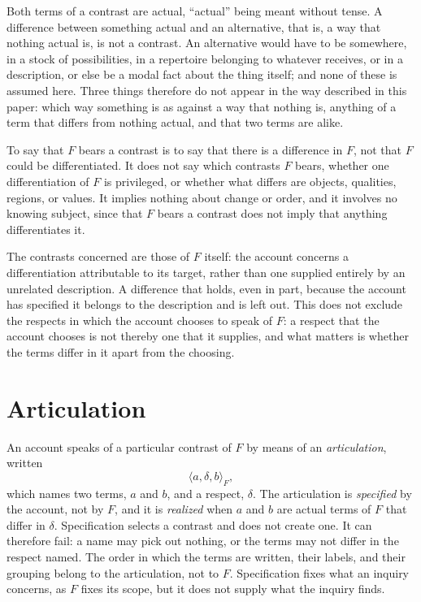 \documentclass[11pt,a4paper,oneside]{scrartcl}
\newcommand{\F}{\ensuremath{F}}
\begin{document}
Both terms of a contrast are actual, \enquote{actual} being meant without tense. A
difference between something actual and an alternative, that is, a way that nothing actual is, is
not a contrast. An alternative would have to be somewhere, in a stock of possibilities, in a
repertoire belonging to whatever receives, or in a description, or else be a modal fact about the
thing itself; and none of these is assumed here. Three things therefore do not appear in the way
described in this paper: which way something is as against a way that nothing is, anything of a
term that differs from nothing actual, and that two terms are alike.

To say that \F{} bears a contrast is to say that there is a difference in \F, not that \F{} could be
differentiated. It does not say which contrasts \F{} bears, whether one differentiation of \F{} is
privileged, or whether what differs are objects, qualities, regions, or values. It implies nothing
about change or order, and it involves no knowing subject, since that \F{} bears a contrast does not
imply that anything differentiates it.

The contrasts concerned are those of \F{} itself: the account concerns a differentiation
attributable to its target, rather than one supplied entirely by an unrelated description. A
difference that holds, even in part, because the account has specified it belongs to the
description and is left out. This does not exclude the respects in which the account chooses to
speak of \F: a respect that the account chooses is not thereby one that it supplies, and what
matters is whether the terms differ in it apart from the choosing.

\section{Articulation}\label{sec:art}

An account speaks of a particular contrast of \F{} by means of an \emph{articulation}, written
\[
  \langle a,\delta,b\rangle_F ,
\]
which names two terms, $a$ and $b$, and a respect, $\delta$. The articulation is \emph{specified} by
the account, not by \F, and it is \emph{realized} when $a$ and $b$ are actual terms of \F{} that
differ in $\delta$. Specification selects a contrast and does not create one. It can therefore
fail: a name may pick out nothing, or the terms may not differ in the respect named. The order in
which the terms are written, their labels, and their grouping belong to the articulation, not to
\F. Specification fixes what an inquiry concerns, as \F{} fixes its scope, but it does not supply
what the inquiry finds.
\end{document}
